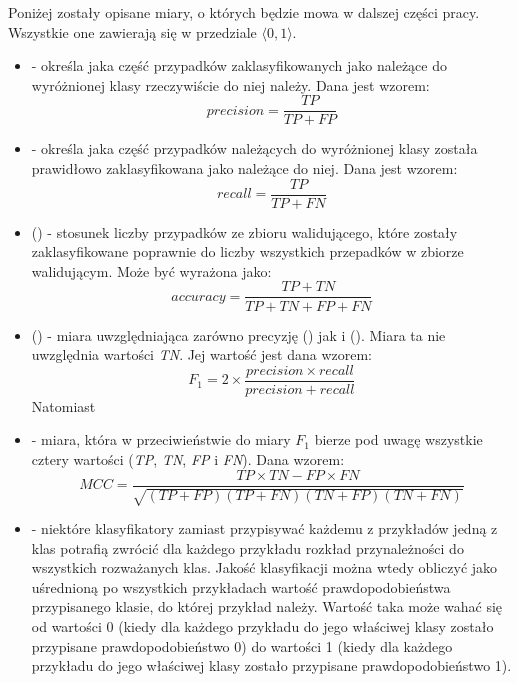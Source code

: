 	 Poniżej zostały opisane miary, o których będzie mowa w dalszej części pracy. Wszystkie one zawierają się w przedziale $ \langle 0,1 \rangle $.

	\begin{itemize}
		\item {} - określa jaka część przypadków zaklasyfikowanych jako należące do wyróżnionej klasy rzeczywiście do niej należy. Dana jest wzorem:
		 $$ precision = \frac{TP}{TP+FP} $$
		
		\item {} - określa jaka część przypadków należących do wyróżnionej klasy została prawidłowo zaklasyfikowana jako należące do niej. Dana jest wzorem:
		$$ recall = \frac{TP}{TP+FN} $$

		\item {} () - stosunek liczby przypadków ze zbioru walidującego, które zostały zaklasyfikowane poprawnie do liczby wszystkich przepadków w zbiorze walidującym. Może być wyrażona jako:
		$$ accuracy = \frac{TP+TN}{TP+TN+FP+FN} $$

		\item {} () - 	miara uwzględniająca zarówno precyzję () jak i  (). Miara ta nie uwzględnia wartości \emph{TN}. Jej wartość jest dana wzorem:
		$$ F_{1} = 2 \times \frac{precision \times recall}{precision + recall} $$
		Natomiast 
		
		\item {} - miara, która w przeciwieństwie do miary $ F_{1} $ bierze pod uwagę wszystkie cztery wartości (\emph{TP}, \emph{TN}, \emph{FP} i \emph{FN}). Dana wzorem: 
		$$ MCC = \frac{ TP \times TN - FP \times FN } {\sqrt{ (TP + FP) ( TP + FN ) ( TN + FP ) ( TN + FN ) } } $$
		
		\item {} - niektóre klasyfikatory zamiast przypisywać każdemu z przykładów jedną z klas potrafią zwrócić dla każdego przykładu rozkład przynależności do wszystkich rozważanych klas. Jakość klasyfikacji można wtedy obliczyć jako uśrednioną po wszystkich przykładach wartość prawdopodobieństwa przypisanego klasie, do której przykład należy. Wartość taka może wahać się od wartości 0 (kiedy dla każdego przykładu do jego właściwej klasy zostało przypisane prawdopodobieństwo 0) do wartości 1 (kiedy dla każdego przykładu do jego właściwej klasy zostało przypisane prawdopodobieństwo 1).
		
	\end{itemize}

